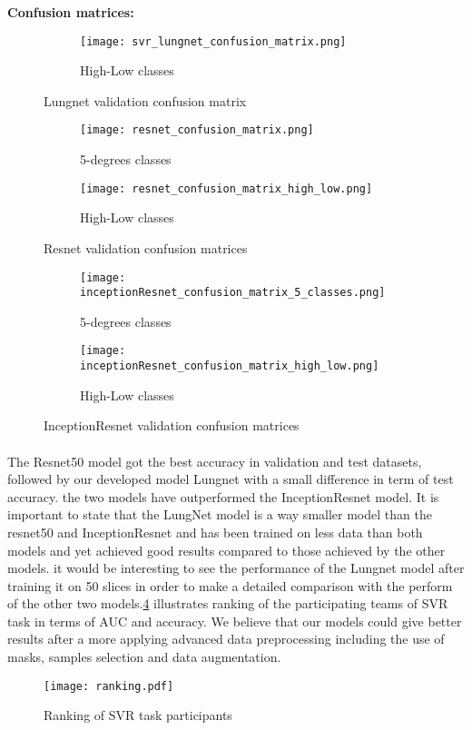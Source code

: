 \textbf{Confusion matrices:}
\begin{figure}[h!]
\centering
  \begin{subfigure}[b]{0.4\linewidth}
    \texttt{[image: svr\_lungnet\_confusion\_matrix.png]}
    \caption{High-Low classes}
  \end{subfigure}
\label{lungnet_conf_mat}
\caption{Lungnet validation confusion matrix }
\end{figure}

\begin{figure}[h!]
\centering
  \begin{subfigure}[b]{0.4\linewidth}
    \texttt{[image: resnet\_confusion\_matrix.png]}
    \caption{5-degrees classes}
  \end{subfigure}
  \begin{subfigure}[b]{0.4\linewidth}
    \texttt{[image: resnet\_confusion\_matrix\_high\_low.png]}
    \caption{High-Low classes}
  \end{subfigure}
\label{resnet_conf_mat}
\caption{Resnet validation confusion matrices }
\end{figure}

\begin{figure}[h!]
\centering
  \begin{subfigure}[b]{0.4\linewidth}
    \texttt{[image: inceptionResnet\_confusion\_matrix\_5\_classes.png]}
    \caption{5-degrees classes}
  \end{subfigure}
  \begin{subfigure}[b]{0.4\linewidth}
    \texttt{[image: inceptionResnet\_confusion\_matrix\_high\_low.png]}
    \caption{High-Low classes}
  \end{subfigure}
\label{InceptionResnet_conf_mat}
\caption{InceptionResnet validation confusion matrices }
\end{figure}
\newpage
\paragraph{}
The Resnet50 model got the best accuracy in validation and test datasets, followed by our developed model Lungnet with a small difference in term of test accuracy. the two models have outperformed the InceptionResnet model. It is important to state that the LungNet model is a way smaller model than the resnet50 and InceptionResnet and has been trained on less data than both models and yet achieved good results compared to those achieved by the other models. it would be interesting to see the performance of the Lungnet model after training it on  50 slices in order to make a detailed comparison with the perform of the other two models.\ref{fig:ranking} illustrates ranking of the participating teams of SVR task in terms of AUC and accuracy. We believe that our models could give better results after a more applying advanced data preprocessing including the use of masks, samples selection and data augmentation.
\begin{figure}[h!]
\texttt{[image: ranking.pdf]}
\caption{Ranking of SVR task participants } 
\label{fig:ranking}
\end{figure}

